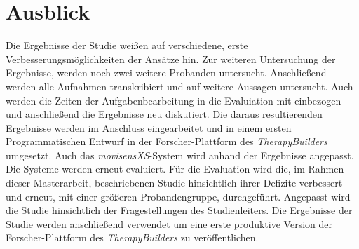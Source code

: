 \section{Ausblick}
Die Ergebnisse der Studie weißen auf verschiedene, erste Verbesserungsmöglichkeiten der Ansätze hin. Zur weiteren Untersuchung der Ergebnisse, werden noch zwei weitere Probanden untersucht. Anschließend werden alle Aufnahmen transkribiert und auf weitere Aussagen untersucht. Auch werden die Zeiten der Aufgabenbearbeitung in die Evaluiation mit einbezogen und anschließend die Ergebnisse neu diskutiert. Die daraus resultierenden Ergebnisse werden im Anschluss eingearbeitet und in einem ersten Programmatischen Entwurf in der Forscher-Plattform des \emph{TherapyBuilders} umgesetzt. Auch das \emph{movisensXS}-System wird anhand der Ergebnisse angepasst. Die Systeme werden erneut evaluiert. Für die Evaluation wird die, im Rahmen dieser Masterarbeit, beschriebenen Studie hinsichtlich ihrer Defizite verbessert und erneut, mit einer größeren Probandengruppe, durchgeführt. Angepasst wird die Studie hinsichtlich der Fragestellungen des Studienleiters. Die Ergebnisse der Studie werden anschließend verwendet um eine erste produktive Version der Forscher-Plattform des \emph{TherapyBuilders} zu veröffentlichen.